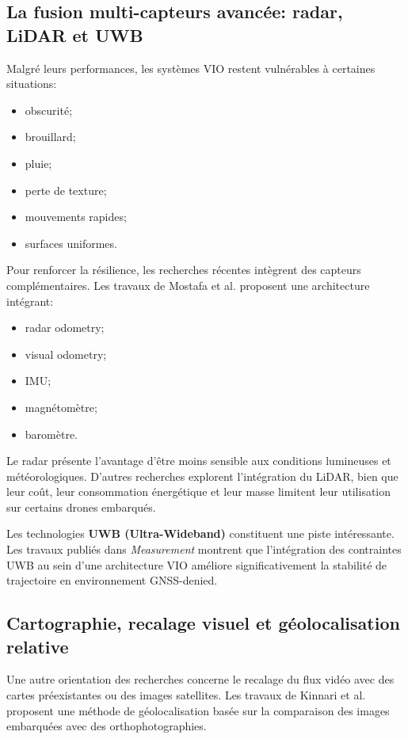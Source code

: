 \documentclass[12pt, a4paper, twoside, openright]{report}
\begin{document}
\subsection{La fusion multi-capteurs avancée: radar, LiDAR et UWB}
Malgré leurs performances, les systèmes VIO restent vulnérables à certaines situations:
\begin{itemize}
    \item obscurité;
    \item brouillard;
    \item pluie;
    \item perte de texture;
    \item mouvements rapides;
    \item surfaces uniformes.
\end{itemize}

Pour renforcer la résilience, les recherches récentes intègrent des capteurs complémentaires. Les travaux de Mostafa et al.\cite{mostafa2022multi} proposent une architecture intégrant:
\begin{itemize}
    \item radar odometry;
    \item visual odometry;
    \item IMU;
    \item magnétomètre;
    \item baromètre.
\end{itemize}

Le radar présente l’avantage d’être moins sensible aux conditions lumineuses et météorologiques. D’autres recherches explorent l’intégration du LiDAR, bien que leur coût, leur consommation énergétique et leur masse limitent leur utilisation sur certains drones embarqués.

Les technologies \textbf{UWB (Ultra-Wideband)} constituent une piste intéressante. Les travaux publiés dans \textit{Measurement} montrent que l’intégration des contraintes UWB au sein d’une architecture VIO améliore significativement la stabilité de trajectoire en environnement GNSS-denied.

\subsection{Cartographie, recalage visuel et géolocalisation relative}
Une autre orientation des recherches concerne le recalage du flux vidéo avec des cartes préexistantes ou des images satellites. Les travaux de Kinnari et al.\cite{kinnari2020visual} proposent une méthode de géolocalisation basée sur la comparaison des images embarquées avec des orthophotographies.
\end{document}
